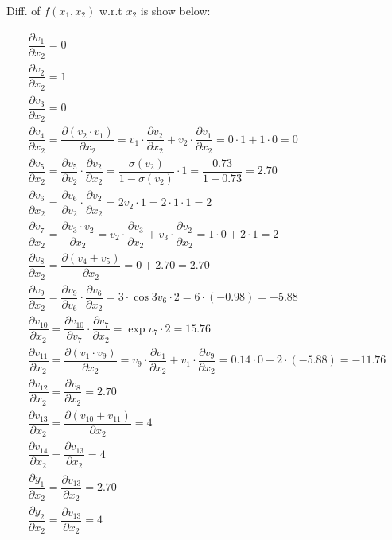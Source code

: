 \documentclass[12pt]{article}
\begin{document}
\begin{enumerate}[label=(\roman*)]
\newpage
Diff. of $f(x_1, x_2)$ w.r.t $x_2$ is show below:\\
\begin{fleqn}
    \begin{gather*}
        \dfrac{\partial v_{1}}{\partial x_{2}} =  0 \\
        \dfrac{\partial v_{2}}{\partial x_{2}} =  1  \\
        \dfrac{\partial v_{3}}{\partial x_{2}} = 0  \\
        \dfrac{\partial v_{4}}{\partial x_{2}} = \dfrac{\partial (v_{2}\cdot v_1)}{\partial x_{2}} = v_1\cdot\dfrac{\partial v_{2}}{\partial x_{2}} + v_2\cdot\dfrac{\partial v_{1}}{\partial x_{2}} = 0\cdot 1 + 1\cdot 0 = 0   \\
        \dfrac{\partial v_{5}}{\partial x_{2}} = \dfrac{\partial v_{5}}{\partial v_{2}}\cdot \dfrac{\partial v_{2}}{\partial x_{2}} =  \dfrac{\sigma(v_2)}{1-\sigma(v_2)} \cdot 1 = \dfrac{0.73}{1-0.73} = 2.70  \\ 
        \dfrac{\partial v_{6}}{\partial x_{2}} = \dfrac{\partial v_{6}}{\partial v_{2}} \cdot \dfrac{\partial v_{2}}{\partial x_{2}} = 2 v_2 \cdot 1 = 2 \cdot 1 \cdot 1 = 2 \\
        \dfrac{\partial v_{7}}{\partial x_{2}} = \dfrac{\partial v_{3}\cdot v_2}{\partial x_{2}} = v_2 \cdot \dfrac{\partial v_{3}}{\partial x_{2}} + v_3 \cdot \dfrac{\partial v_{2}}{\partial x_{2}} = 1 \cdot 0 + 2 \cdot 1 = 2 \\ 
        \dfrac{\partial v_{8}}{\partial x_{2}} = \dfrac{\partial (v_{4} + v_5)}{\partial x_{2}} = 0 + 2.70 = 2.70  \\
        \dfrac{\partial v_{9}}{\partial x_{2}} = \dfrac{\partial v_{9}}{\partial v_{6}} \cdot \dfrac{\partial v_{6}}{\partial x_{2}} = 3 \cdot \cos{3v_6} \cdot 2 =  6 \cdot (-0.98) = -5.88  \\
        \dfrac{\partial v_{10}}{\partial x_{2}} = \dfrac{\partial v_{10}}{\partial v_{7}} \cdot \dfrac{\partial v_{7}}{\partial x_{2}}  = \exp{v_7} \cdot 2 = 15.76  \\
        \dfrac{\partial v_{11}}{\partial x_{2}} = \dfrac{\partial (v_{1}\cdot v_9)}{\partial x_{2}} = v_9\cdot\dfrac{\partial v_{1}}{\partial x_{2}} + v_1\cdot\dfrac{\partial v_{9}}{\partial x_{2}} = 0.14 \cdot 0 + 2\cdot (-5.88) = -11.76  \\
        \dfrac{\partial v_{12}}{\partial x_{2}} = \dfrac{\partial v_{8}}{\partial x_{2}} = 2.70  \\
        \dfrac{\partial v_{13}}{\partial x_{2}} = \dfrac{\partial (v_{10} + v_11)}{\partial x_{2}} = 4  \\
        \dfrac{\partial v_{14}}{\partial x_{2}} = \dfrac{\partial v_{13}}{\partial x_{2}}  = 4 \\
        \dfrac{\partial y_{1}}{\partial x_{2}} = \dfrac{\partial v_{13}}{\partial x_{2}}  = 2.70 \\
        \dfrac{\partial y_{2}}{\partial x_{2}} = \dfrac{\partial v_{13}}{\partial x_{2}}  = 4 \\
    \end{gather*}
\end{fleqn}


\end{enumerate}
\end{document}
